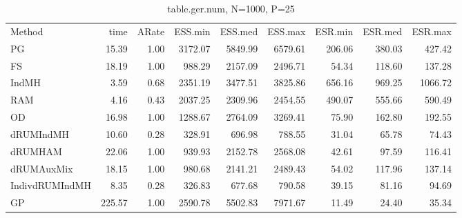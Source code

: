 \begin{table}
\begin{tabular}{l r r r r r r r r } 
          Method  &     time &    ARate &  ESS.min &  ESS.med &  ESS.max &  ESR.min &  ESR.med &  ESR.max \\ 
              PG  &    15.39 &     1.00 &  3172.07 &  5849.99 &  6579.61 &   206.06 &   380.03 &   427.42 \\ 
              FS  &    18.19 &     1.00 &   988.29 &  2157.09 &  2496.71 &    54.34 &   118.60 &   137.28 \\ 
           IndMH  &     3.59 &     0.68 &  2351.19 &  3477.51 &  3825.86 &   656.16 &   969.25 &  1066.72 \\ 
             RAM  &     4.16 &     0.43 &  2037.25 &  2309.96 &  2454.55 &   490.07 &   555.66 &   590.49 \\ 
              OD  &    16.98 &     1.00 &  1288.67 &  2764.09 &  3269.41 &    75.90 &   162.80 &   192.55 \\ 
       dRUMIndMH  &    10.60 &     0.28 &   328.91 &   696.98 &   788.55 &    31.04 &    65.78 &    74.43 \\ 
         dRUMHAM  &    22.06 &     1.00 &   939.93 &  2152.78 &  2568.08 &    42.61 &    97.59 &   116.41 \\ 
      dRUMAuxMix  &    18.15 &     1.00 &   980.68 &  2141.21 &  2489.43 &    54.02 &   117.96 &   137.14 \\ 
  IndivdRUMIndMH  &     8.35 &     0.28 &   326.83 &   677.68 &   790.58 &    39.15 &    81.16 &    94.69 \\ 
              GP  &   225.57 &     1.00 &  2590.78 &  5502.83 &  7971.67 &    11.49 &    24.40 &    35.34
 \end{tabular}
\caption{table.ger.num, N=1000, P=25}
\end{table}


